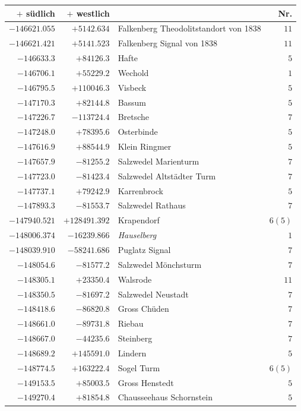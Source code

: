 \clearpage{}%
\begin{center}\begingroup\fontsize{8}{9}\selectfont
\setlength{\tabcolsep}{4pt}
\begin{tabular}{r|r|p{170pt}|r}\hline
\(+\) südlich&\(+\) westlich&&Nr.\\\hline
\(-146621.055\)&\(+5142.634\)&Falkenberg Theodolitstandort von 1838&\(11\)\\
\(-146621.421\)&\(+5141.523\)&Falkenberg Signal von 1838&\(11\)\\
\(-146633.3\)&\(+84126.3\)&Hafte&\(5\)\\
\(-146706.1\)&\(+55229.2\)&Wechold&\(1\)\\
\(-146795.5\)&\(+110046.3\)&Visbeck&\(5\)\\
\(-147170.3\)&\(+82144.8\)&Bassum&\(5\)\\
\(-147226.7\)&\(-113724.4\)&Bretsche&\(7\)\\
\(-147248.0\)&\(+78395.6\)&Osterbinde&\(5\)\\
\(-147616.9\)&\(+88544.9\)&Klein Ringmer&\(5\)\\
\(-147657.9\)&\(-81255.2\)&Salzwedel Marienturm&\(7\)\\
\(-147723.0\)&\(-81423.4\)&Salzwedel Altstädter Turm&\(7\)\\
\(-147737.1\)&\(+79242.9\)&Karrenbrock&\(5\)\\
\(-147893.3\)&\(-81553.7\)&Salzwedel Rathaus&\(7\)\\
\(-147940.521\)&\(+128491.392\)&Krapendorf&\(6 (5)\)\\
\(-148006.374\)&\(-16239.866\)&\textit{Hauselberg}&\(1\)\\
\(-148039.910\)&\(-58241.686\)&Puglatz Signal&\(7\)\\
\(-148054.6\)&\(-81577.2\)&Salzwedel Mönchsturm&\(7\)\\
\(-148305.1\)&\(+23350.4\)&Walsrode&\(11\)\\
\(-148350.5\)&\(-81697.2\)&Salzwedel Neustadt&\(7\)\\
\(-148418.6\)&\(-86820.8\)&Gross Chüden&\(7\)\\
\(-148661.0\)&\(-89731.8\)&Riebau&\(7\)\\
\(-148667.0\)&\(-44235.6\)&Steinberg&\(7\)\\
\(-148689.2\)&\(+145591.0\)&Lindern&\(5\)\\
\(-148774.5\)&\(+163222.4\)&Sogel Turm&\(6 (5)\)\\
\(-149153.5\)&\(+85003.5\)&Gross Henstedt&\(5\)\\
\(-149270.4\)&\(+81854.8\)&Chausseehaus Schornstein&\(5\)\\

\end{tabular}
\end{center}
